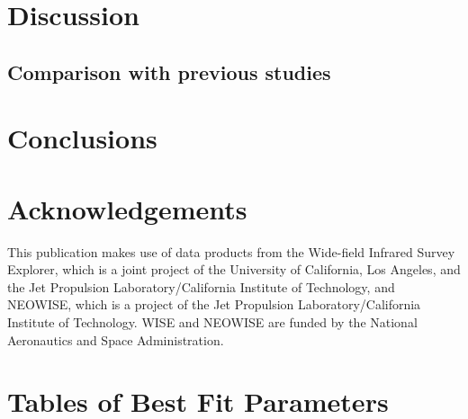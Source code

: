 \documentclass[fleqn, usenatbib]{mnras}
\begin{document}
\section{Discussion}
\subsection{Comparison with previous studies}

\section{Conclusions}

\section*{Acknowledgements}
This publication makes use of data products from the Wide-field Infrared Survey Explorer, which is a joint project of the University of California, Los Angeles, and the Jet Propulsion Laboratory/California Institute of Technology, and NEOWISE, which is a project of the Jet Propulsion Laboratory/California Institute of Technology. WISE and NEOWISE are funded by the National Aeronautics and Space Administration.







\appendix

\section{Tables of Best Fit Parameters}
\end{document}
